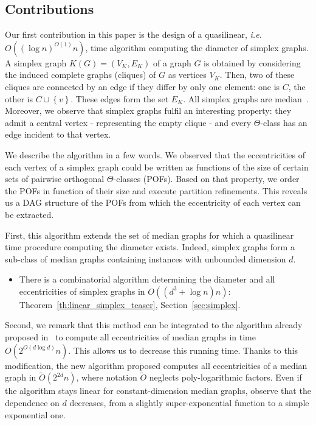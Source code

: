\documentclass[a4paper,UKenglish,numberwithinsect,cleveref, autoref]{lipics-v2021}
\newcommand{\set}[1]{\left\{ #1 \right\}}
\begin{document}
\subsection{Contributions}

Our first contribution in this paper is the design of a quasilinear, {\em i.e.} $O((\log n)^{O(1)}n)$, time algorithm computing the diameter of simplex graphs. A simplex graph $K(G) = (V_K,E_K)$ of a graph $G$ is obtained by considering the induced complete graphs (cliques) of $G$ as vertices $V_K$. Then, two of these cliques are connected by an edge if they differ by only one element: one is $C$, the other is $C \cup \set{v}$. These edges form the set $E_K$. All simplex graphs are median~\cite{BaCh08,BaLeMo86}. Moreover, we observe that simplex graphs fulfil an interesting property: they admit a central vertex - representing the empty clique - and every $\Theta$-class has an edge incident to that vertex.

We describe the algorithm in a few words. We observed that the eccentricities of each vertex of a simplex graph could be written as functions of the size of certain sets of pairwise orthogonal $\Theta$-classes (POFs). Based on that property, we order the POFs in function of their size and execute partition refinements. This reveals us a DAG structure of the POFs from which the eccentricity of each vertex can be extracted. 

First, this algorithm extends the set of median graphs for which a quasilinear time procedure computing the diameter exists. Indeed, simplex graphs form a sub-class of median graphs containing instances with unbounded dimension $d$.

\begin{itemize}
    \item There is a combinatorial algorithm determining the diameter and all eccentricities of simplex graphs in $O((d^3+\log n)n)$: Theorem~\ref{th:linear_simplex_teaser}, Section~\ref{sec:simplex}.
\end{itemize}

Second, we remark that this method can be integrated to the algorithm already proposed in~\cite{BeHa21} to compute all eccentricities of median graphs in time $O(2^{O(d\log d)}n)$. This allows us to decrease this running time. Thanks to this modification, the new algorithm proposed computes all eccentricities of a median graph in $\tilde{O}(2^{2d}n)$, where notation $\tilde{O}$ neglects poly-logarithmic factors. Even if the algorithm stays linear for constant-dimension median graphs, observe that the dependence on $d$ decreases, from a slightly super-exponential function to a simple exponential one.
\end{document}
